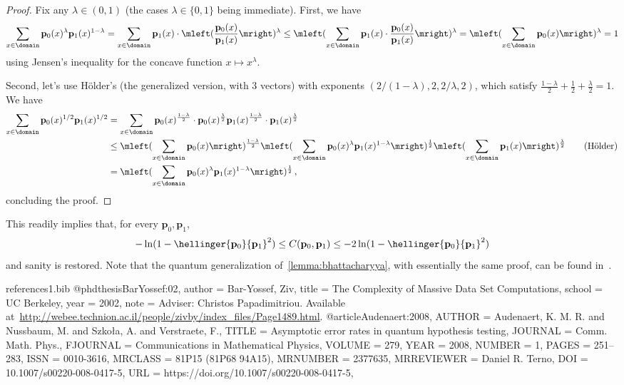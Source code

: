 \documentclass[10pt]{article}
\newcommand{\p}{\mathbf{p}}
\begin{document}
\begin{proof}
Fix any $\lambda \in(0,1)$ (the cases $\lambda\in\{0,1\}$ being immediate). First, we have
\[
\sum_{x\in\domain} \p_0(x)^\lambda\p_1(x)^{1-\lambda}
 = \sum_{x\in\domain} \p_1(x)\cdot \mleft(\frac{\p_0(x)}{\p_1(x)}\mright)^\lambda
 \leq \mleft(\sum_{x\in\domain} \p_1(x)\cdot \frac{\p_0(x)}{\p_1(x)}\mright)^\lambda
 = \mleft(\sum_{x\in\domain} \p_0(x)\mright)^\lambda = 1
\] 
using Jensen's inequality for the concave function $x\mapsto x^\lambda$. 

Second, let's use H\"older's (the generalized version, with 3 vectors) with exponents $(2/(1-\lambda), 2, 2/\lambda, 2)$, which satisfy $\frac{1-\lambda}{2}+\frac{1}{2}+\frac{\lambda}{2}=1$. We have
\begin{align*}
\sum_{x\in\domain} \p_0(x)^{1/2}\p_1(x)^{1/2}
 &= \sum_{x\in\domain} \p_0(x)^{\frac{1-\lambda}{2}}\cdot \p_0(x)^{\frac{\lambda}{2}}\p_1(x)^{\frac{1-\lambda}{2}}\cdot \p_1(x)^{\frac{\lambda}{2}}\\
 &\leq \mleft(\sum_{x\in\domain} \p_0(x)\mright)^{\frac{1-\lambda}{2}}\mleft(\sum_{x\in\domain} \p_0(x)^{\lambda}\p_1(x)^{1-\lambda} \mright)^{\frac{1}{2}}\mleft(\sum_{x\in\domain} \p_1(x)\mright)^{\frac{\lambda}{2}} \tag{H\"older}\\
 &= \mleft(\sum_{x\in\domain} \p_0(x)^{\lambda}\p_1(x)^{1-\lambda} \mright)^{\frac{1}{2}}\,,
\end{align*}
concluding the proof.
\end{proof}
This readily implies that, for every $\p_0,\p_1$,
\begin{equation}
-\ln(1-\hellinger{\p_0}{\p_1}^2) \leq C(\p_0,\p_1) \leq -2\ln(1-\hellinger{\p_0}{\p_1}^2)
\end{equation}
and sanity is restored. Note that the quantum generalization of~\autoref{lemma:bhattacharyya}, with essentially the same proof, can be found in~\cite[Theorem~6]{Audenaert:2008}.


\begin{filecontents}{references1.bib}
@phdthesis{BarYossef:02,
  author = {Bar-Yossef, Ziv},
  title = {The Complexity of Massive Data Set Computations},
  school = {UC Berkeley},
  year = {2002},
  note = {Adviser: Christos Papadimitriou. Available at~\url{http://webee.technion.ac.il/people/zivby/index_files/Page1489.html}.}
}
@article{Audenaert:2008,
    AUTHOR = {Audenaert, K. M. R. and Nussbaum, M. and Szko\l a, A. and
              Verstraete, F.},
     TITLE = {Asymptotic error rates in quantum hypothesis testing},
   JOURNAL = {Comm. Math. Phys.}, 
  FJOURNAL = {Communications in Mathematical Physics},
    VOLUME = {279},
      YEAR = {2008},
    NUMBER = {1},
     PAGES = {251--283},
      ISSN = {0010-3616},
   MRCLASS = {81P15 (81P68 94A15)},
  MRNUMBER = {2377635},
MRREVIEWER = {Daniel R. Terno},
       DOI = {10.1007/s00220-008-0417-5},
       URL = {https://doi.org/10.1007/s00220-008-0417-5},
}
\end{filecontents}


\end{document}
